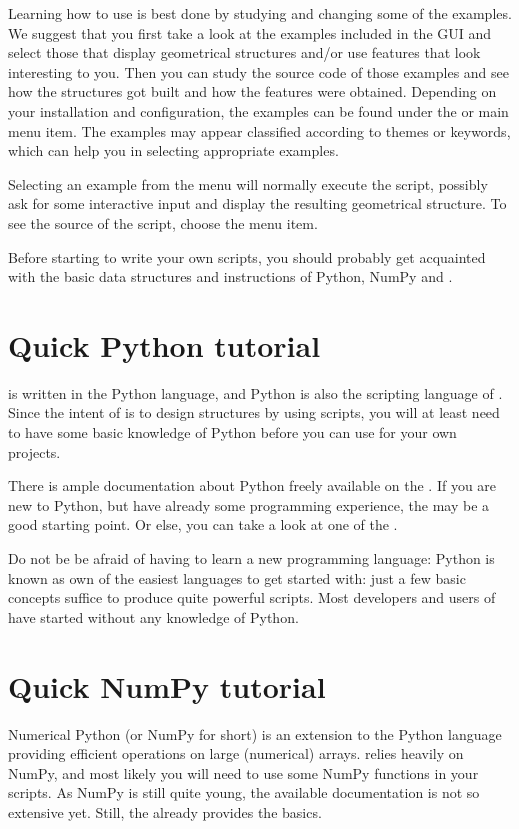 Learning how to use \pyformex is best done by studying and changing some of the examples. We suggest that you first take a look at the examples included in the \pyformex GUI and select those that display geometrical structures and/or use features that look interesting to you. Then you can study the source code of those examples and see how the structures got built and how the features were obtained.
Depending on your installation and configuration, the examples can be found under the  or  main menu item.
The examples may appear classified according to themes or keywords, which can help you in selecting appropriate examples.

Selecting an example from the menu will normally execute the script, possibly ask for some interactive input and display the resulting geometrical structure.
To see the source of the script, choose the  menu item.

Before starting to write your own scripts, you should probably get acquainted with the basic data structures and instructions of Python, NumPy and \pyf.


\section{Quick {Python tutorial}}
\label{sec:python-tutorial}
\pyf is written in the Python language, and Python is also the scripting language of \pyf. Since the intent of \pyf is to design structures by using scripts, you will at least need to have some basic knowledge of Python before you can use \pyf for your own projects.

There is ample documentation about Python freely available on the . 
If you are new to Python, but have already some programming experience, the  may be a good starting point.
Or else, you can take a look at one of the . 

Do not be be afraid of having to learn a new programming language: Python is known as own of the easiest languages to get started with: just a few basic concepts suffice to produce quite powerful scripts. Most developers and users of \pyf have started without any knowledge of Python.



\section{Quick NumPy tutorial}
\label{sec:numpy-tutorial}
Numerical Python (or NumPy for short) is an extension to the Python language providing efficient operations on large (numerical) arrays. \pyf relies heavily on NumPy, and most likely you will need to use some NumPy functions in your scripts. As NumPy is still quite young, the available documentation is not so extensive yet. Still, the  already provides the basics.

